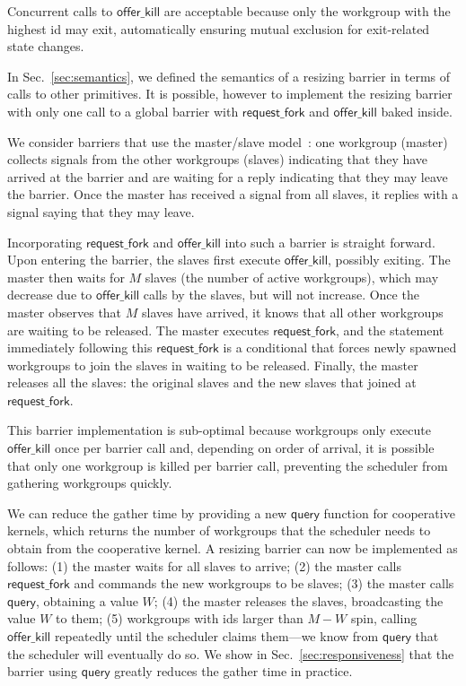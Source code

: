 \documentclass[parskip=half,sigconf,review, anonymous=true, acmcopyrightmode=none]{acmart}
\newcommand{\mysec}{Sec.~}
\newcommand{\offerfork}{\mathsf{request\_fork}}
\newcommand{\offerkill}{\mathsf{offer\_kill}}
\newcommand{\keyword}[1]{\mathsf{#1}}
\begin{document}
Concurrent calls to $\offerkill$ are acceptable because only the
workgroup with the highest id may exit, automatically ensuring mutual
exclusion for exit-related state changes.

%
In \mysec\ref{sec:semantics}, we defined the semantics of a resizing
barrier in terms of calls to other primitives.  It is possible,
however to implement the resizing barrier with only one call to a
global barrier with $\offerfork$ and $\offerkill$ baked inside.

We consider barriers that use the master/slave model~\cite{XF10}: one
workgroup (master) collects signals from the other workgroups (slaves)
indicating that they have arrived at the barrier and are waiting for a
reply indicating that they may leave the barrier. Once the master has
received a signal from all slaves, it replies with a signal saying that
they may leave.

Incorporating $\offerfork$ and $\offerkill$ into such a barrier is
straight forward. Upon entering the barrier, the slaves first execute
$\offerkill$, possibly exiting. The master then waits for $M$ slaves
(the number of active workgroups), which may decrease due to
$\offerkill$ calls by the slaves, but will not increase. Once the
master observes that $M$ slaves have arrived, it knows that all other
workgroups are waiting to be released. The master executes
$\offerfork$, and the statement immediately following this
$\offerfork$ is a conditional that forces newly spawned workgroups to
join the slaves in waiting to be released. Finally, the master
releases all the slaves: the original slaves and the new slaves that
joined at $\offerfork$.

This barrier implementation is sub-optimal because workgroups only
execute $\offerkill$ once per barrier call and, depending on order of
arrival, it is possible that only one workgroup is killed per barrier
call, preventing the scheduler from gathering workgroups quickly.

We can reduce the gather time by providing a new
$\keyword{query}$ function for cooperative kernels, which returns the
number of workgroups that the scheduler needs to obtain from the
cooperative kernel.
%
%
A resizing barrier can now be implemented as follows: (1) the master
waits for all slaves to arrive; (2) the master calls $\offerfork$ and
commands the new workgroups to be slaves; (3) the master calls
$\keyword{query}$, obtaining a value $W$; (4) the master releases the
slaves, broadcasting the value $W$ to them; (5) workgroups with ids
larger than $M-W$ spin, calling $\offerkill$ repeatedly until the
scheduler claims them---we know from $\keyword{query}$ that the
scheduler will eventually do so.  
We show in
\mysec\ref{sec:responsiveness} that the barrier using $\keyword{query}$ greatly
reduces the gather time in practice.
\end{document}
